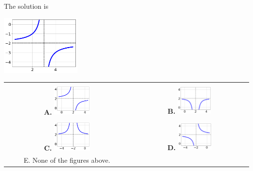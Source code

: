 \documentclass{extbook}[14pt]
\begin{document}
 
 The solution is  
 \begin{center} \includegraphics[width=0.3\textwidth]{../Figures/rationalEquationToGraphBD.png} \end{center}\begin{tabular}{|c|c|} 
\hline 
 & \tabularnewline 
 \textbf{A.} \includegraphics[width=0.3\textwidth]{../Figures/rationalEquationToGraphAB.png} & \textbf{B.} \includegraphics[width=0.3\textwidth]{../Figures/rationalEquationToGraphBB.png} \tabularnewline 
\hline 
 & \tabularnewline 
 \textbf{C.} \includegraphics[width=0.3\textwidth]{../Figures/rationalEquationToGraphCB.png} & \textbf{D.} \includegraphics[width=0.3\textwidth]{../Figures/rationalEquationToGraphDB.png} \tabularnewline 
\hline 
 E. None of the figures above. & \tabularnewline 
\hline 
 \end{tabular} 
 
\end{document}
